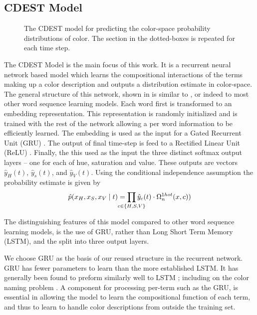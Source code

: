 \documentclass[11pt,letterpaper]{article}
\newcommand{\parencite}{\cite}
\newcommand{\textcite}{\newcite}
\begin{document}
\subsection{CDEST Model}

\begin{figure}
	\resizebox{\columnwidth}{!}{}
	
	\caption{\label{network}
		The CDEST model for predicting the color-space probability distributions of color.
		The section in the dotted-boxes is repeated for each time step.
	}
\end{figure}

The CDEST Model is the main focus of this work.
It is a recurrent neural network based model which learns the compositional interactions of the terms making up a color description and outputs a distribution estimate in color-space.
The general structure of this network, shown in  is similar to \textcite{2016arXiv160603821M}, or indeed to most other word sequence learning models.
Each word first is transformed to an embedding representation.
This representation is randomly initialized and is trained with the rest of the network allowing a per word information to be efficiently learned.
The embedding is used as the input for a Gated Recurrent Unit (GRU)  \parencite{cho2014properties}.
The output of final time-step is feed to a Rectified Linear Unit (ReLU)  \parencite{dahl2013reludropout}.
Finally, the this used as the input the three distinct softmax output layers -- one for each of hue, saturation and value.
These outputs are vectors $\hat{y}_{H}(t)$, $\hat{y}_{s}(t)$, and $\hat{y}_{V}(t)$.
Using the conditional independence assumption the probability estimate is given by
\begin{equation*}%
	\hat{p}(x_H,x_S,x_V\mid t) = \displaystyle\prod_{
		\mathclap{c\in {\{H,S,V\}}}}
	 \hat{y}_{c}(t)\cdot \Omega_{n}^{1hot}(x,c))
\end{equation*}

The distinguishing features of this model compared to other word sequence learning models, is the use of GRU, rather than Long Short Term Memory (LSTM), and the split into three output layers.


We choose GRU as the basis of our reused structure in the recurrent network.
GRU has fewer parameters to learn than the more established LSTM.
It has generally been found to preform similarly well to LSTM \parencite{chung2014empirical};
including on the color naming problem \parencite{2016arXiv160603821M}.
A component for processing per-term such as the GRU, is essential in allowing the model to learn the compositional function of each term,  and thus to learn to handle color descriptions from outside the training set.
\end{document}
